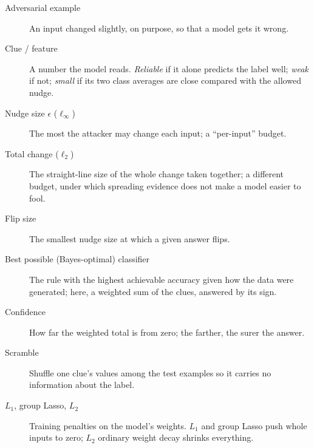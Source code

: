 \documentclass[11pt]{article}
\begin{document}
\begin{description}
\item[Adversarial example] An input changed slightly, on purpose, so that a model gets it wrong.
\item[Clue / feature] A number the model reads. \emph{Reliable} if it alone predicts the label well; \emph{weak} if not; \emph{small} if its two class averages are close
compared with the allowed nudge.
\item[Nudge size $\epsilon$ ($\ell_\infty$)] The most the attacker may change each input; a ``per-input'' budget.
\item[Total change ($\ell_2$)] The straight-line size of the whole change taken together; a different budget, under which spreading evidence does not make a model easier to fool.
\item[Flip size] The smallest nudge size at which a given answer flips.
\item[Best possible (Bayes-optimal) classifier] The rule with the highest achievable accuracy given how the data were generated; here, a weighted sum of the clues, answered by its sign.
\item[Confidence] How far the weighted total is from zero; the farther, the surer the answer.
\item[Scramble] Shuffle one clue's values among the test examples so it carries no information about the label.
\item[$L_1$, group Lasso, $L_2$] Training penalties on the model's weights. $L_1$ and group Lasso push whole inputs to zero; $L_2$ ordinary weight decay shrinks everything.
\end{description}
\end{document}
